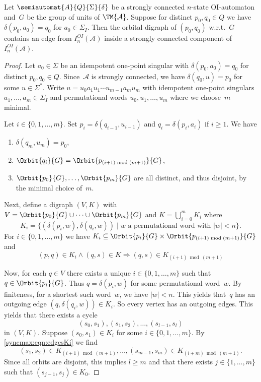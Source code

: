 \begin{lemma} \label{sync_max:graph:bound:lem:I-and-orbitals}
	Let $\semiautomat{A}{Q}{\Sigma}{\delta}$
	be a strongly connected $n$-state OI-automaton and~$G$ be the group of units of $\TM{\mathcal A}$.	
	Suppose  for distinct $p_0, q_0 \in Q$
	we have $\delta(p_0, a_0) = q_0$
	for $a_0 \in \Sigma_I$.
	Then the orbital digraph of $(p_0,q_0)$
	w.r.t.~$G$
	contains an edge from $I_{n}^{OI}(\mathcal A)$
	inside a strongly connected component
	of $I_{n}^{OI}(\mathcal A)$.
\end{lemma}
\begin{proof}
	Let $a_0 \in \Sigma$ be an idempotent one-point singular
	with $\delta(p_0, a_0) = q_0$
	for distinct $p_0,q_0 \in Q$.
	Since~$\mathcal A$ is strongly connected,
	we have $\delta(q_0, u) = p_0$
	for some $u \in \Sigma^*$. Write $u = u_0 a_1 u_1 \cdots u_{m-1} a_m u_m$
	with idempotent one-point singulars $a_1,\ldots,a_m \in \Sigma_I$
	and permutational words $u_0, u_1,\ldots, u_m$
	where we choose~$m$ minimal.	
	
	Let $i \in \{0,1,\ldots,m\}$.
	Set $p_i = \delta(q_{i-1}, u_{i-1})$
	and $q_i = \delta(p_i, a_i)$ if $i \ge 1$. 	
	We have
	\begin{enumerate}
	\item $\delta(q_m, u_m) = p_0$, 
		
	\item $\Orbit{q_i}{G} = \Orbit{p_{(i+1) \bmod (m+1)}}{G}$,
	
	\item $\Orbit{p_0}{G}, \ldots, \Orbit{p_m}{G}$
	are all distinct, and thus disjoint, by the minimal choice of~$m$.
	\end{enumerate}
	
	Next, define a digraph $(V, K)$
	with $V = \Orbit{p_0}{G} \cup \cdots \cup \Orbit{p_m}{G}$ 
	and $K = \bigcup_{i=0}^m K_i$
	where 
	\[
	K_i = \{ (\delta(p_i, w), \delta(q_i, w)) \mid \text{$w$ a permutational word with $|w| < n$} \}.
	\]
	For $i \in \{0,1,\ldots,m\}$
	we have $K_i \subseteq \Orbit{p_i}{G} \times \Orbit{p_{(i+1) \bmod (m+1)}}{G}$ and
	\begin{equation} \label{syncmax:eqn:edgesKi}
		(p,q) \in K_i \land (q, s) \in K \Rightarrow (q, s) \in K_{(i+1) \bmod (m+1)}
	\end{equation}
	
	Now, for each $q \in V$
	there exists a unique $i \in \{0,1,\ldots,m\}$
	such that $q \in \Orbit{p_i}{G}$.
	Thus $q = \delta(p_i, w)$ for some permutational word~$w$.
	By finiteness, for a shortest such word~$w$,
	we have $|w| < n$.
	This yields that~$q$ has an outgoing 
	edge $(q, \delta(q_i, w)) \in K_i$.
	So every vertex has an outgoing edges.
	This yields that there exists a cycle
	\[
	(s_0, s_1), (s_1, s_2), \ldots, (s_{l-1}, s_l)
	\]
	in $(V,K)$. 
	Suppose $(s_0, s_1) \in K_i$ for some $i \in \{0,1,\ldots,m\}$.
	By \cref{syncmax:eqn:edgesKi} we find
	\[
	(s_1, s_2) \in K_{(i + 1) \bmod (m+1)}, \ldots, (s_{m-1}, s_m) \in K_{(i + m) \bmod (m+1)}.
	\] 
	Since all orbits are disjoint, this implies $l \ge m$ and 
	that there exists $j \in\{1,\ldots,m\}$ such that $(s_{j-1}, s_j) \in K_0$.


\end{proof}
